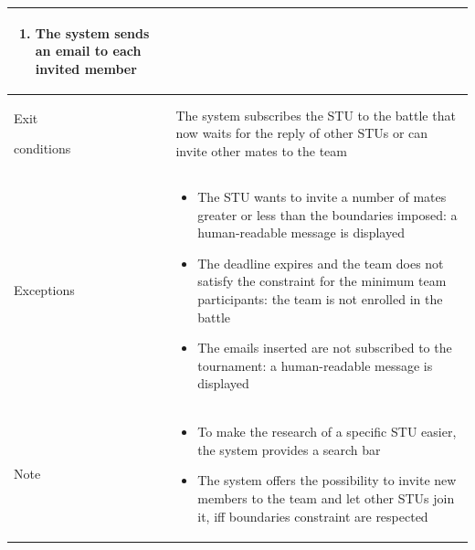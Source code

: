 \begin{center}
\begin{tabular}{| m{2cm} | m{10cm}|}
\begin{enumerate}
                                    \item The system sends an email to each invited member
                                \end{enumerate}                                                                                                                                                                     \\ \hline
        Exit \par conditions  & The system subscribes the STU to the battle that now waits for the reply of other STUs or can invite other mates to the team                                                         \\ \hline
        Exceptions            & \begin{itemize}
                                    \item The STU wants to invite a number of mates greater or less than the boundaries imposed: a human-readable message is displayed
                                    \item The deadline expires and the team does not satisfy the constraint for the minimum team participants: the team is not enrolled in the battle
                                    \item The emails inserted are not subscribed to the tournament: a human-readable message is displayed
                                \end{itemize}                                                                                                                                                                       \\ \hline
        Note                  & \begin{itemize}
                                    \item To make the research of a specific STU easier, the system provides a search bar
                                    \item The system offers the possibility to invite new members to the team and let other STUs join it, iff boundaries constraint are respected            
                                \end{itemize}                                                                                                                                                                       \\ \hline
    \end{tabular}
\end{center}

